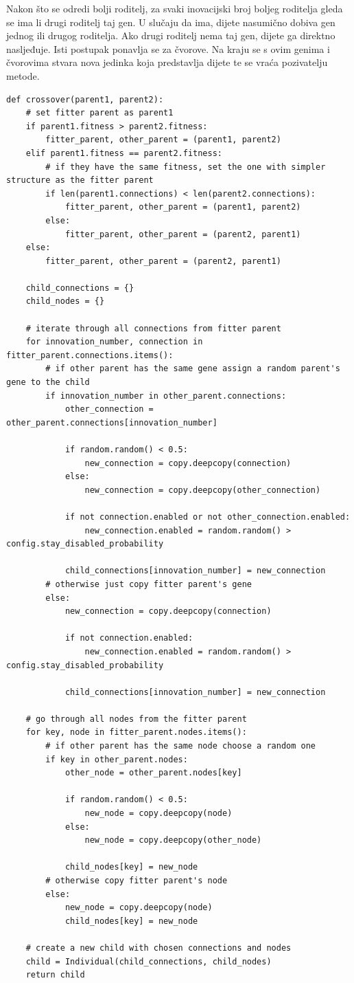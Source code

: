 \documentclass[times, utf8, diplomski, numeric]{fer}
\begin{document}
Nakon što se odredi bolji roditelj, za svaki inovacijski broj boljeg roditelja gleda se ima li drugi roditelj taj gen. U slučaju da ima, dijete nasumično dobiva gen jednog ili drugog roditelja. Ako drugi roditelj nema taj gen, dijete ga direktno nasljeđuje. Isti postupak ponavlja se za čvorove. Na kraju se s ovim genima i čvorovima stvara nova jedinka koja predstavlja dijete te se vraća pozivatelju metode.

\begin{lstlisting}[frame=single, label=kod14, caption=Izvorni tekst metode \textit{crossover} u klasi \textit{Individual}]
def crossover(parent1, parent2):
	# set fitter parent as parent1
	if parent1.fitness > parent2.fitness:
		fitter_parent, other_parent = (parent1, parent2)
	elif parent1.fitness == parent2.fitness:
		# if they have the same fitness, set the one with simpler structure as the fitter parent
		if len(parent1.connections) < len(parent2.connections):
			fitter_parent, other_parent = (parent1, parent2)
		else:
			fitter_parent, other_parent = (parent2, parent1)
	else:
		fitter_parent, other_parent = (parent2, parent1)

	child_connections = {}
	child_nodes = {}

	# iterate through all connections from fitter parent
	for innovation_number, connection in fitter_parent.connections.items():
		# if other parent has the same gene assign a random parent's gene to the child
		if innovation_number in other_parent.connections:
			other_connection = other_parent.connections[innovation_number]

			if random.random() < 0.5:
				new_connection = copy.deepcopy(connection)
			else:
				new_connection = copy.deepcopy(other_connection)

			if not connection.enabled or not other_connection.enabled:
				new_connection.enabled = random.random() > config.stay_disabled_probability

			child_connections[innovation_number] = new_connection
		# otherwise just copy fitter parent's gene
		else:
			new_connection = copy.deepcopy(connection)

			if not connection.enabled:
				new_connection.enabled = random.random() > config.stay_disabled_probability

			child_connections[innovation_number] = new_connection

	# go through all nodes from the fitter parent
	for key, node in fitter_parent.nodes.items():
		# if other parent has the same node choose a random one
		if key in other_parent.nodes:
			other_node = other_parent.nodes[key]

			if random.random() < 0.5:
				new_node = copy.deepcopy(node)
			else:
				new_node = copy.deepcopy(other_node)

			child_nodes[key] = new_node
		# otherwise copy fitter parent's node
		else:
			new_node = copy.deepcopy(node)
			child_nodes[key] = new_node

	# create a new child with chosen connections and nodes
	child = Individual(child_connections, child_nodes)
	return child
\end{lstlisting}
\end{document}
